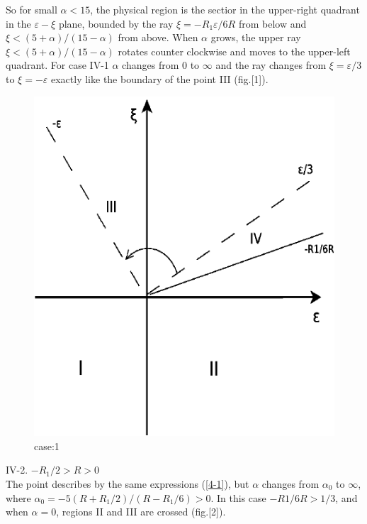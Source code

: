 \documentclass[12pt]{article}
\begin{document}
So for small $\alpha<15$, the physical region is the sectior in the upper-right quadrant in the $\varepsilon-\xi$
plane, bounded by the ray $\xi=-R_1\varepsilon/6R$ from below and $\xi<(5+\alpha)/(15-\alpha)$
from above. 
When $\alpha$ grows, the upper ray $\xi<(5+\alpha)/(15-\alpha)$ rotates counter clockwise
and moves to the upper-left quadrant. For case IV-1 $\alpha$ changes from 0 to $\infty$ and the ray
changes from $\xi=\varepsilon/3$ to $\xi=-\varepsilon$ exactly like the boundary of the point III (fig.[1]).\\
\begin{figure}
 \includegraphics{./Diagram1.pdf}
 \caption{case:1}
 \label{fig:1}
\end{figure}



IV-2. $-R_1/2>R>0$ \\
The point describes by the same expressions (\ref{4-1}), but $\alpha$ changes from $\alpha_{0}$ to $\infty$,
where $\alpha_{0}=-5(R+R_1/2)/(R-R_1/6)>0$. In this case $-R1/6R>1/3$, and when $\alpha=0$, regions II and III
 are crossed (fig.[2]).
\end{document}
